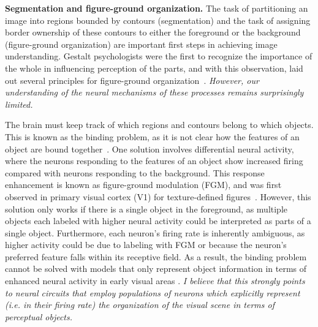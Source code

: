 \documentclass[11pt,notitlepage]{article}
\newcommand{\ie}[0]{{\em i.e.}\xspace}
\begin{document}
\textbf{Segmentation and figure-ground organization.} The task of
partitioning an image into regions bounded by contours (segmentation)
and the task of assigning border ownership of these contours to either
the foreground or the background (figure-ground organization) are
important first steps in achieving image understanding.  Gestalt
psychologists were the first to recognize the importance of the whole
in influencing perception of the parts, and with this observation,
laid out several principles for figure-ground
organization~\citep{Koffka35, Wertheimer23}. \textit{However, our
  understanding of the neural mechanisms of these processes remains
  surprisingly limited.}
 
 The brain must keep track of which regions and contours belong to which objects.
  This is known as the binding problem, as it is not clear how the features of an object are bound together~\citep{Treisman96b}.
 One solution involves differential
neural activity, where the neurons responding to the features of an
object show increased firing compared with neurons responding to the
background.
This response enhancement is known as figure-ground
modulation (FGM), and was first observed in primary visual cortex (V1)
for texture-defined
figures~\citep{Lamme95}.
%
However, this solution only works if there is a single object in the
foreground, as multiple objects each labeled with higher neural
activity could be interpreted as parts of a single
object. Furthermore, each neuron's firing rate is inherently
ambiguous, as higher activity could be due to labeling with FGM or
because the neuron's preferred feature falls within its receptive
field. As a result, the
binding problem cannot be solved 
with models that only represent object information in terms of enhanced neural activity in early visual areas \citep{Niebur00a}. {\em I believe that this strongly points to neural circuits that employ populations of neurons which explicitly represent (\ie in their firing rate) the organization of the visual scene in terms of perceptual objects.}
\end{document}
